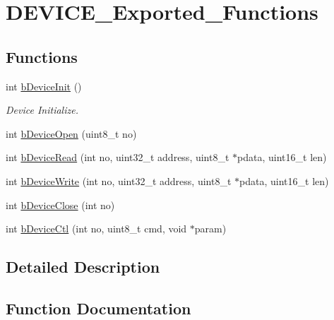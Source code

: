 \hypertarget{group___d_e_v_i_c_e___exported___functions}{}\section{D\+E\+V\+I\+C\+E\+\_\+\+Exported\+\_\+\+Functions}
\label{group___d_e_v_i_c_e___exported___functions}
\subsection*{Functions}
\begin{DoxyCompactItemize}
\item 
int \mbox{\hyperlink{group___d_e_v_i_c_e___exported___functions_ga404e753d491d3b3e4c6fba215d191fa7}{b\+Device\+Init}} ()
\begin{DoxyCompactList}\small\item\em Device Initialize. \end{DoxyCompactList}\item 
int \mbox{\hyperlink{group___d_e_v_i_c_e___exported___functions_gac022bd943e28b18b2dce587207c25788}{b\+Device\+Open}} (uint8\+\_\+t no)
\item 
int \mbox{\hyperlink{group___d_e_v_i_c_e___exported___functions_ga580d17c32a7382f586cc11ba84160e09}{b\+Device\+Read}} (int no, uint32\+\_\+t address, uint8\+\_\+t $\ast$pdata, uint16\+\_\+t len)
\item 
int \mbox{\hyperlink{group___d_e_v_i_c_e___exported___functions_ga7b100bfb070e715961c0bfe2da20d6be}{b\+Device\+Write}} (int no, uint32\+\_\+t address, uint8\+\_\+t $\ast$pdata, uint16\+\_\+t len)
\item 
int \mbox{\hyperlink{group___d_e_v_i_c_e___exported___functions_gaf8441490c33a1dfa5e56b510d332df29}{b\+Device\+Close}} (int no)
\item 
int \mbox{\hyperlink{group___d_e_v_i_c_e___exported___functions_gac8137793df6d7d8399128f4997cb0914}{b\+Device\+Ctl}} (int no, uint8\+\_\+t cmd, void $\ast$param)
\end{DoxyCompactItemize}


\subsection{Detailed Description}


\subsection{Function Documentation}
\mbox{\label{group___d_e_v_i_c_e___exported___functions_gaf8441490c33a1dfa5e56b510d332df29}} 
